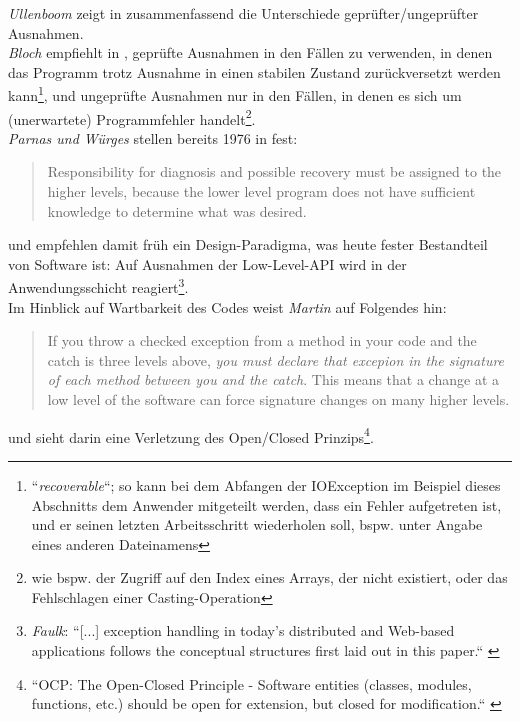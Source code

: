 \noindent
\textit{Ullenboom} zeigt in \cite[589, Abschnitt 9.3.9]{Ull23} zusammenfassend die Unterschiede geprüfter/ungeprüfter Ausnahmen.\\

\noindent
\textit{Bloch} empfiehlt in \cite[296]{Blo17}, geprüfte Ausnahmen in den Fällen zu verwenden, in denen das Programm trotz Ausnahme in einen stabilen Zustand zurückversetzt werden kann\footnote{
    ``\textit{recoverable}``; so kann bei dem Abfangen der IOException im Beispiel dieses Abschnitts dem Anwender mitgeteilt werden, dass ein Fehler aufgetreten ist, und er seinen letzten Arbeitsschritt wiederholen soll, bspw. unter Angabe eines anderen Dateinamens
}, und ungeprüfte Ausnahmen nur in den Fällen, in denen es sich um (unerwartete) Programmfehler handelt\footnote{wie bspw. der Zugriff auf den Index eines Arrays, der nicht existiert, oder das Fehlschlagen einer Casting-Operation}.\\

\noindent
\textit{Parnas und Würges} stellen bereits 1976 in \cite{PW76} fest:

\blockquote[]{
    Responsibility for diagnosis and possible recovery must be assigned to the higher levels, because the lower level program does not have sufficient knowledge to determine what was desired.
}

\noindent
und empfehlen damit früh ein Design-Paradigma, was heute fester Bestandteil von Software ist: Auf Ausnahmen der Low-Level-API wird in der Anwendungsschicht reagiert\footnote{
    \textit{Faulk}: ``[...] exception handling in today's distributed and Web-based applications follows the conceptual structures first laid out in this paper.`` \cite[229]{HW01}
}.\\

\noindent
Im Hinblick auf Wartbarkeit des Codes weist \textit{Martin} auf Folgendes hin:

\blockquote[{\cite[107, Hervorhebungen i.O.]{Mar08}}]{
    If you throw a checked exception from a method in your code and the catch is three levels above, \textit{you must declare that excepion in the signature of each method between you and the catch}. This means that a change at a low level of the software can force signature changes on many higher levels.
}

und sieht darin eine Verletzung des Open/Closed Prinzips\footnote{
    ``OCP: The Open-Closed Principle - Software entities (classes, modules, functions, etc.) should be open for extension, but closed for modification.`` \cite[99]{Mar03}
}.